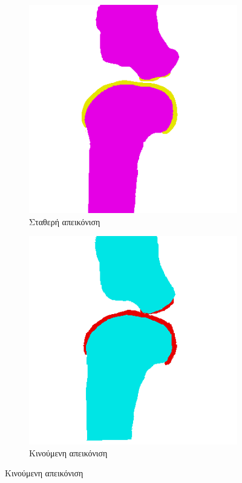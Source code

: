 \documentclass[a4paper,12pt]{article}
\begin{document}
\begin{figure}[H]
    \centering

    \begin{subfigure}[t]{0.4\linewidth}
    \includegraphics[width=\linewidth]{original_label_registration_1.png}
    \caption{Σταθερή απεικόνιση}
    \end{subfigure}
    \begin{subfigure}[t]{0.4\linewidth}
    \includegraphics[width=\linewidth]{moving_label_after_registration_1.png}
    \caption{Κινούμενη απεικόνιση}
    \end{subfigure}


\end{figure}
\end{document}
